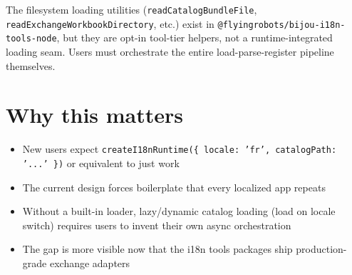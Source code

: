 The filesystem loading utilities (\texttt{r\allowbreak{}e\allowbreak{}a\allowbreak{}d\allowbreak{}C\allowbreak{}a\allowbreak{}t\allowbreak{}a\allowbreak{}l\allowbreak{}o\allowbreak{}g\allowbreak{}B\allowbreak{}u\allowbreak{}n\allowbreak{}d\allowbreak{}l\allowbreak{}e\allowbreak{}F\allowbreak{}i\allowbreak{}l\allowbreak{}e}, \texttt{r\allowbreak{}e\allowbreak{}a\allowbreak{}d\allowbreak{}E\allowbreak{}x\allowbreak{}c\allowbreak{}h\allowbreak{}a\allowbreak{}n\allowbreak{}g\allowbreak{}e\allowbreak{}W\allowbreak{}o\allowbreak{}r\allowbreak{}k\allowbreak{}b\allowbreak{}o\allowbreak{}o\allowbreak{}k\allowbreak{}D\allowbreak{}i\allowbreak{}r\allowbreak{}e\allowbreak{}c\allowbreak{}t\allowbreak{}o\allowbreak{}r\allowbreak{}y}, etc.) exist in \texttt{@\allowbreak{}f\allowbreak{}l\allowbreak{}y\allowbreak{}i\allowbreak{}n\allowbreak{}g\allowbreak{}r\allowbreak{}o\allowbreak{}b\allowbreak{}o\allowbreak{}t\allowbreak{}s\allowbreak{}/\allowbreak{}b\allowbreak{}i\allowbreak{}j\allowbreak{}o\allowbreak{}u\allowbreak{}-\allowbreak{}i\allowbreak{}1\allowbreak{}8\allowbreak{}n\allowbreak{}-\allowbreak{}t\allowbreak{}o\allowbreak{}o\allowbreak{}l\allowbreak{}s\allowbreak{}-\allowbreak{}n\allowbreak{}o\allowbreak{}d\allowbreak{}e}, but they are opt-in tool-tier helpers, not a runtime-integrated loading seam. Users must orchestrate the entire load-parse-register pipeline themselves.

\section{Why this matters}\label{record-357-why-this-matters}

\begin{itemize}
\tightlist
\item
  New users expect \texttt{c\allowbreak{}r\allowbreak{}e\allowbreak{}a\allowbreak{}t\allowbreak{}e\allowbreak{}I\allowbreak{}1\allowbreak{}8\allowbreak{}n\allowbreak{}R\allowbreak{}u\allowbreak{}n\allowbreak{}t\allowbreak{}i\allowbreak{}m\allowbreak{}e\allowbreak{}(\allowbreak{}\{\allowbreak{} \allowbreak{}l\allowbreak{}o\allowbreak{}c\allowbreak{}a\allowbreak{}l\allowbreak{}e\allowbreak{}:\allowbreak{} \allowbreak{}'\allowbreak{}f\allowbreak{}r\allowbreak{}'\allowbreak{},\allowbreak{} \allowbreak{}c\allowbreak{}a\allowbreak{}t\allowbreak{}a\allowbreak{}l\allowbreak{}o\allowbreak{}g\allowbreak{}P\allowbreak{}a\allowbreak{}t\allowbreak{}h\allowbreak{}:\allowbreak{} \allowbreak{}'\allowbreak{}.\allowbreak{}.\allowbreak{}.\allowbreak{}'\allowbreak{} \allowbreak{}\}\allowbreak{})} or equivalent to just work
\item
  The current design forces boilerplate that every localized app repeats
\item
  Without a built-in loader, lazy/dynamic catalog loading (load on locale switch) requires users to invent their own async orchestration
\item
  The gap is more visible now that the i18n tools packages ship production-grade exchange adapters
\end{itemize}

